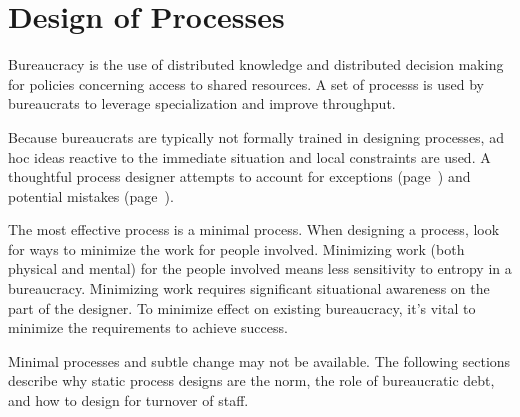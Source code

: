 \section{Design of Processes\label{sec:design-of-processes}}




Bureaucracy is the use of distributed knowledge and distributed decision making for policies concerning access to shared resources. A set of \glspl{process}
is used by \glspl{bureaucrat} to leverage specialization and improve throughput. 
    
Because bureaucrats are typically not formally trained in designing processes, ad hoc ideas reactive to the immediate situation and local constraints are used. A thoughtful process designer attempts to account for exceptions (page~\pageref{sec:exceptions-to-process}) and potential mistakes (page~\pageref{sec:process-mistakes}).

The most effective process is a minimal process.
When designing a process, look for ways to minimize the work for people involved. Minimizing work (both physical and mental) for the people involved means less sensitivity to entropy in a bureaucracy. Minimizing work requires significant situational awareness on the part of the designer. To minimize effect on existing bureaucracy, it's vital to minimize the requirements to achieve success.

Minimal processes and subtle change may not be available.
The following sections describe why static process designs are the norm, the role of bureaucratic debt, and how to design for turnover of staff.
    




 